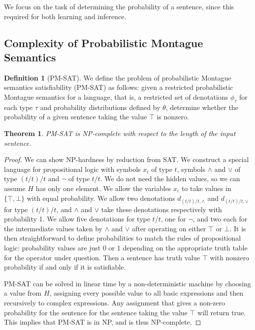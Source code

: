 \documentclass[11pt]{article}
\newtheorem*{theorem}{Theorem}
\theoremstyle{definition}
\newtheorem*{definition}{Definition}
\begin{document}
We focus on the task of determining the probability of a sentence,
since this required for both learning and inference.

\subsection{Complexity of Probabilistic Montague Semantics}

\begin{definition}[PM-SAT]
  We define the problem of probabilistic Montague semantics
  satisfiability (PM-SAT) as follows: given a restricted probabilistic
  Montague semantics for a language, that is, a restricted set of
  denotations $\phi_\tau$ for each type $\tau$ and probability
  distributions defined by $\theta$, determine whether the probability
  of a given sentence taking the value $\top$ is nonzero.
\end{definition}

\begin{theorem}
  \emph{PM-SAT} is NP-complete with respect to the length of the input
  sentence.
\end{theorem}

\begin{proof}
We can show NP-hardness by reduction from SAT. We construct a special
language for propositional logic with symbols $x_i$ of type $t$,
symbols $\land$ and $\lor$ of type $(t/t)/t$ and $\lnot$ of type
$t/t$. We do not need the hidden values, so we can assume $H$ has only
one element. We allow the variables $x_i$ to take values in $\{\top, \bot\}$
with equal probability. We allow two denotations $d_{(t/t)/t, \land}$
and $d_{(t/t)/t, \lor}$ for type $(t/t)/t$, and $\land$ and $\lor$
take these denotations respectively with probability 1. We allow five
denotations for type $t/t$, one for $\lnot$, and two each for the
intermediate values taken by $\land$ and $\lor$ after operating on
either $\top$ or $\bot$. It is then straightforward to define
probabilities to match the rules of propositional logic: probability
values are just 0 or 1 depending on the appropriate truth table for
the operator under question. Then a sentence has truth value $\top$
with nonzero probability if and only if it is satisfiable.

PM-SAT can be solved in linear time by a non-deterministic machine by
choosing a value from $H$, assigning every possible value to all basic
expressions and then recursively to complex expressions. Any
assignment that gives a non-zero probability for the sentence for the
sentence taking the value $\top$ will return true. This implies that
PM-SAT is in NP, and is thus NP-complete.
\end{proof}
\end{document}
